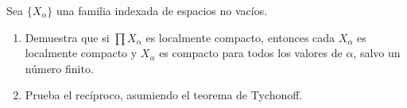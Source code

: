 \item Sea $\{X_\alpha\}$ una familia indexada de espacios no vacíos.
    \begin{enumerate}
        \item Demuestra que si $\prod X_\alpha$ es localmente compacto, entonces cada $X_\alpha$ es localmente compacto y $X_\alpha$ es compacto para todos los valores de $\alpha$, salvo un número finito.
        \item Prueba el recíproco, asumiendo el teorema de Tychonoff.
    \end{enumerate}